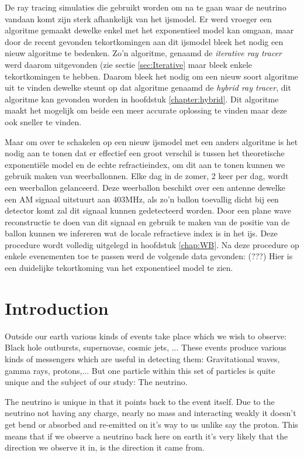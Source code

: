 \documentclass[11pt,a4paper,faculty=we,language=en,doctype=report]{cls/ugent-doc}
\begin{document}
De ray tracing simulaties die gebruikt worden om na te gaan waar de neutrino
vandaan komt zijn sterk afhankelijk van het ijsmodel.  Er werd vroeger een
algoritme gemaakt dewelke enkel met het exponentieel model kan omgaan, maar
door de recent gevonden tekortkomingen aan dit ijsmodel bleek het nodig een
nieuw algoritme te bedenken. Zo'n algoritme, genaamd de \textit{iterative ray
tracer} werd daarom uitgevonden (zie sectie \ref{sec:Iterative} maar bleek
enkele tekortkomingen te hebben. Daarom bleek het nodig om een nieuw soort
algoritme uit te vinden dewelke steunt op dat algoritme genaamd de
\textit{hybrid ray tracer}, dit algoritme kan gevonden worden in hoofdstuk
\ref{chapter:hybrid}. Dit algoritme maakt het mogelijk om beide een meer
accurate oplossing te vinden maar deze ook sneller te vinden.

Maar om over te schakelen op een nieuw ijsmodel met een anders algoritme is het nodig aan te tonen dat er effectief
een groot verschil is tussen het theoretische exponentiële model en de echte refractieindex, om dit aan te tonen 
kunnen we gebruik maken van weerballonnen. Elke dag in de zomer, 2 keer per dag, wordt een weerballon gelanceerd. 
Deze weerballon beschikt over een antenne dewelke een AM signaal uitstuurt aan 403MHz, als zo'n ballon toevallig
dicht bij een detector komt zal dit signaal kunnen gedetecteerd worden. Door een plane wave reconstructie te doen
van dit signaal en gebruik te maken van de positie van de ballon kunnen we infereren wat de locale refractieve index
is in het ijs. Deze procedure wordt volledig uitgelegd in hoofdstuk \ref{chap:WB}.
Na deze procedure op enkele evenementen toe te passen werd de volgende data gevonden:
(???)
Hier is een duidelijke tekortkoming van het exponentieel model te zien.
\newpage
\chapter*{Introduction}
Outside our earth various kinds of events take place which we wish to 
observe: Black hole outbursts, supernovae, cosmic jets, ...
These events produce various kinds of messengers which are useful in
detecting them: Gravitational waves, gamma rays, protons,...
But one particle within this set of particles is quite unique and
the subject of our study: The neutrino. 

The neutrino is unique in that it points back to the event itself.
Due to the neutrino not having any charge, nearly no mass and 
interacting weakly it doesn't get bend or absorbed and re-emitted 
on it's way to us unlike say the proton. This means that if we observe
a neutrino back here on earth it's very likely that the direction we observe
it in, is the direction it came from.
\end{document}
